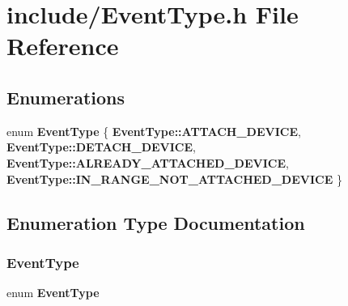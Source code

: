\section{include/\+Event\+Type.h File Reference}
\label{_event_type_8h}
\subsection*{Enumerations}
\begin{DoxyCompactItemize}
\item 
enum \textbf{ Event\+Type} \{ \textbf{ Event\+Type\+::\+A\+T\+T\+A\+C\+H\+\_\+\+D\+E\+V\+I\+CE}, 
\textbf{ Event\+Type\+::\+D\+E\+T\+A\+C\+H\+\_\+\+D\+E\+V\+I\+CE}, 
\textbf{ Event\+Type\+::\+A\+L\+R\+E\+A\+D\+Y\+\_\+\+A\+T\+T\+A\+C\+H\+E\+D\+\_\+\+D\+E\+V\+I\+CE}, 
\textbf{ Event\+Type\+::\+I\+N\+\_\+\+R\+A\+N\+G\+E\+\_\+\+N\+O\+T\+\_\+\+A\+T\+T\+A\+C\+H\+E\+D\+\_\+\+D\+E\+V\+I\+CE}
 \}
\end{DoxyCompactItemize}


\subsection{Enumeration Type Documentation}
\mbox{\label{_event_type_8h_a2628ea8d12e8b2563c32f05dc7fff6fa}} 
\subsubsection{EventType}
{\footnotesize\ttfamily enum \textbf{ Event\+Type}\hspace{0.3cm}{\ttfamily [strong]}}

